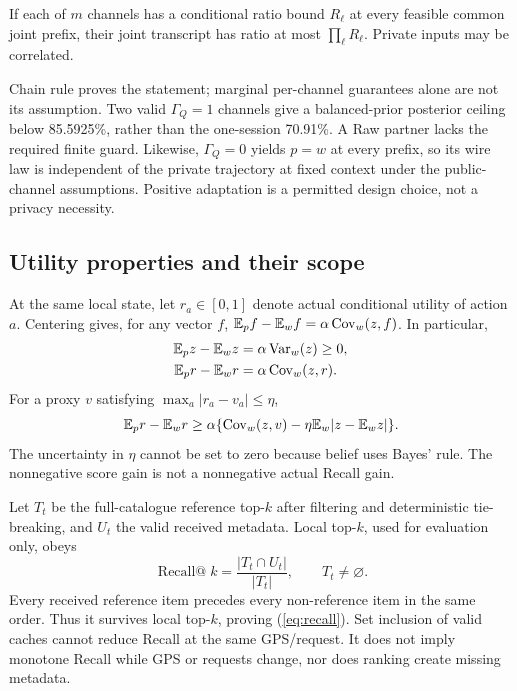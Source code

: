 \begin{corollary}\label{cor:joint}
If each of $m$ channels has a conditional ratio bound $R_\ell$ at every feasible
common joint prefix, their joint transcript has ratio at most $\prod_\ell R_\ell$.
Private inputs may be correlated.
\end{corollary}
Chain rule proves the statement; marginal per-channel guarantees alone are not its
assumption. Two valid $\Gamma_Q=1$ channels give a balanced-prior posterior ceiling
below 85.5925\%, rather than the one-session 70.91\%. A Raw partner lacks the required
finite guard. Likewise, $\Gamma_Q=0$ yields $p=w$ at every prefix, so its wire law is
independent of the private trajectory at fixed context under the public-channel
assumptions. Positive adaptation is a permitted design choice, not a privacy necessity.

\subsection{Utility properties and their scope}\label{sec:utility}
At the same local state, let $r_a\in[0,1]$ denote actual conditional utility of action
$a$. Centering gives, for any vector $f$,
$\mathbb E_pf-\mathbb E_wf=\alpha\operatorname{Cov}_w(z,f)$. In particular,
\begin{align}
\mathbb E_pz-\mathbb E_wz&=\alpha\operatorname{Var}_w(z)\ge0,\\
\mathbb E_pr-\mathbb E_wr&=\alpha\operatorname{Cov}_w(z,r). \label{eq:gain}
\end{align}
For a proxy $v$ satisfying $\max_a|r_a-v_a|\le\eta$,
\begin{equation}
\mathbb E_pr-\mathbb E_wr\ge\alpha\{\operatorname{Cov}_w(z,v)-\eta\mathbb E_w|z-\mathbb E_wz|\}. \label{eq:calibration}
\end{equation}
The uncertainty in $\eta$ cannot be set to zero because belief uses Bayes' rule.
The nonnegative score gain is not a nonnegative actual Recall gain.

Let $T_t$ be the full-catalogue reference top-$k$ after filtering and deterministic
tie-breaking, and $U_t$ the valid received metadata. Local top-$k$, used for evaluation
only, obeys
\begin{equation}
\operatorname{Recall@}k=\frac{|T_t\cap U_t|}{|T_t|},\qquad T_t\ne\varnothing. \label{eq:recall}
\end{equation}
Every received reference item precedes every non-reference item in the same order.
Thus it survives local top-$k$, proving (\ref{eq:recall}). Set inclusion of valid
caches cannot reduce Recall at the same GPS/request. It does not imply monotone
Recall while GPS or requests change, nor does ranking create missing metadata.

